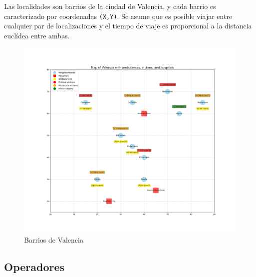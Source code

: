 Las localidades son barrios de la ciudad de Valencia, y cada barrio es caracterizado por coordenadas \lstinline|(X,Y)|.
Se asume que es posible viajar entre cualquier par de localizaciones y el tiempo de viaje es proporcional a la distancia euclídea entre ambas.
\begin{figure}[htbp]
   \centering
   \includegraphics{images/valencia_map.png}
   \caption{Barrios de Valencia}
   \label{fig:valencia_map}
\end{figure}

\subsection{Operadores}

